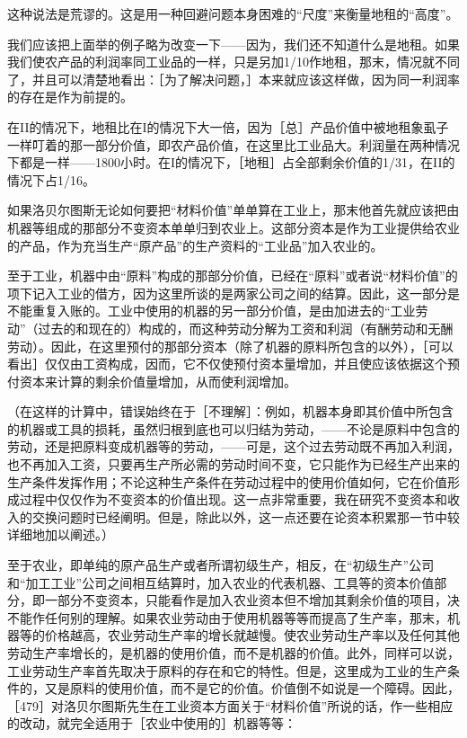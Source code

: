 这种说法是荒谬的。这是用一种回避问题本身困难的“尺度”来衡量地租的“高度”。

我们应该把上面举的例子略为改变一下——因为，我们还不知道什么是地租。如果我们使农产品的利润率同工业品的一样，只是另加1/10作地租，那末，情况就不同了，并且可以清楚地看出：［为了解决问题，］本来就应该这样做，因为同一利润率的存在是作为前提的。

在II的情况下，地租比在I的情况下大一倍，因为［总］产品价值中被地租象虱子一样叮着的那一部分价值，即农产品价值，在这里比工业品大。利润量在两种情况下都是一样——1800小时。在I的情况下，［地租］占全部剩余价值的1/31，在II的情况下占1/16。

如果洛贝尔图斯无论如何要把“材料价值”单单算在工业上，那末他首先就应该把由机器等组成的那部分不变资本单单归到农业上。这部分资本是作为工业提供给农业的产品，作为充当生产“原产品”的生产资料的“工业品”加入农业的。

至于工业，机器中由“原料”构成的那部分价值，已经在“原料”或者说“材料价值”的项下记入工业的借方，因为这里所谈的是两家公司之间的结算。因此，这一部分是不能重复入账的。工业中使用的机器的另一部分价值，是由加进去的“工业劳动”（过去的和现在的）构成的，而这种劳动分解为工资和利润（有酬劳动和无酬劳动）。因此，在这里预付的那部分资本（除了机器的原料所包含的以外），［可以看出］仅仅由工资构成，因而，它不仅使预付资本量增加，并且使应该依据这个预付资本来计算的剩余价值量增加，从而使利润增加。

（在这样的计算中，错误始终在于［不理解］：例如，机器本身即其价值中所包含的机器或工具的损耗，虽然归根到底也可以归结为劳动，——不论是原料中包含的劳动，还是把原料变成机器等的劳动，——可是，这个过去劳动既不再加入利润，也不再加入工资，只要再生产所必需的劳动时间不变，它只能作为已经生产出来的生产条件发挥作用；不论这种生产条件在劳动过程中的使用价值如何，它在价值形成过程中仅仅作为不变资本的价值出现。这一点非常重要，我在研究不变资本和收入的交换问题时已经阐明。但是，除此以外，这一点还要在论资本积累那一节中较详细地加以阐述。）

至于农业，即单纯的原产品生产或者所谓初级生产，相反，在“初级生产”公司和“加工工业”公司之间相互结算时，加入农业的代表机器、工具等的资本价值部分，即一部分不变资本，只能看作是加入农业资本但不增加其剩余价值的项目，决不能作任何别的理解。如果农业劳动由于使用机器等等而提高了生产率，那末，机器等的价格越高，农业劳动生产率的增长就越慢。使农业劳动生产率以及任何其他劳动生产率增长的，是机器的使用价值，而不是机器的价值。此外，同样可以说，工业劳动生产率首先取决于原料的存在和它的特性。但是，这里成为工业的生产条件的，又是原料的使用价值，而不是它的价值。价值倒不如说是一个障碍。因此，［479］对洛贝尔图斯先生在工业资本方面关于“材料价值”所说的话，作一些相应的改动，就完全适用于［农业中使用的］机器等等：

